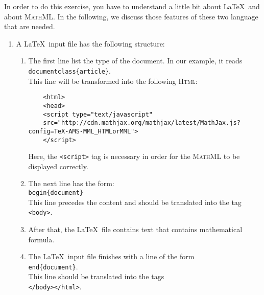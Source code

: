 In order to do this exercise, you have to understand a little bit about \LaTeX\ and about 
\textsc{MathML}.  In the following, we discuss those features of these two language that are needed.
\begin{enumerate}
\item A \LaTeX\ input file has the following structure:
      \begin{enumerate}
      \item The first line list the type of the document.  In our example, it reads
            \\[0.2cm]
            \hspace*{1.3cm}
            \texttt{documentclass\{article\}}.
            \\[0.2cm]
            This line will be transformed into the following \textsc{Html}:
            \begin{verbatim}
    <html>
    <head>
    <script type="text/javascript"
    src="http://cdn.mathjax.org/mathjax/latest/MathJax.js?config=TeX-AMS-MML_HTMLorMML">
    </script>
            \end{verbatim}
            Here, the \texttt{<script>} tag is necessary in order for the \textsc{MathML} 
            to be displayed correctly.
      \item The next line has the form:
            \\[0.2cm]
            \hspace*{1.3cm}
            \texttt{begin\{document\}}
            \\[0.2cm]
            This line precedes the content and should be translated into the tag
            \\[0.2cm]
            \hspace*{1.3cm}
            \texttt{<body>}.
      \item After that, the \LaTeX\ file contains text that contains mathematical formula.
      \item The \LaTeX\ input file finishes with a line of the form
            \\[0.2cm]
            \hspace*{1.3cm}
            \texttt{end\{document\}}.
            \\[0.2cm]
            This line should be translated into the tags
            \\[0.2cm]
            \hspace*{1.3cm}
            \texttt{</body></html>}.
      \end{enumerate}

\end{enumerate}

